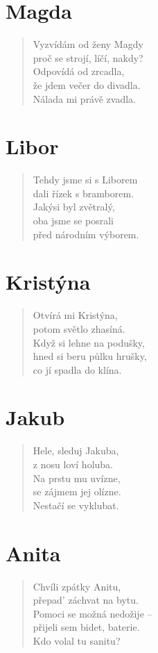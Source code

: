 \section*{Magda}
\begin{verse}
Vyzvídám od ženy Magdy\\
proč se strojí, líčí, nakdy?\\
Odpovídá od zrcadla,\\
že jdem večer do divadla.\\
Nálada mi právě zvadla.
\end{verse}    

\section*{Libor}
\begin{verse}
Tehdy jsme si s Liborem\\
dali řízek s bramborem.\\
Jakýsi byl zvětralý,\\
oba jsme se posrali\\
před národním výborem.
\end{verse}    

\section*{Kristýna}
\begin{verse}
Otvírá mi Kristýna,\\
potom světlo zhasíná.\\
Když si lehne na podušky,\\
hned si beru půlku hrušky,\\
co jí spadla do klína.
\end{verse}    

\section*{Jakub}
\begin{verse}
Hele, sleduj Jakuba,\\
z nosu loví holuba.\\
Na prstu mu uvízne,\\
se zájmem jej olízne.\\
Nestačí se vyklubat.
\end{verse}    

\section*{Anita}
\begin{verse}
Chvíli zpátky Anitu,\\
přepad' záchvat na bytu.\\
Pomoci se možná nedožije --\\
přijeli sem bidet, baterie.\\
Kdo volal tu sanitu?
\end{verse}    

